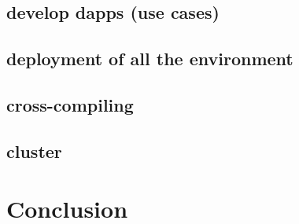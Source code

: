     \subsection{develop dapps (use cases)}
    \subsection{deployment of all the environment}
    \subsection{cross-compiling}
    \subsection{cluster}


\section{Conclusion}
